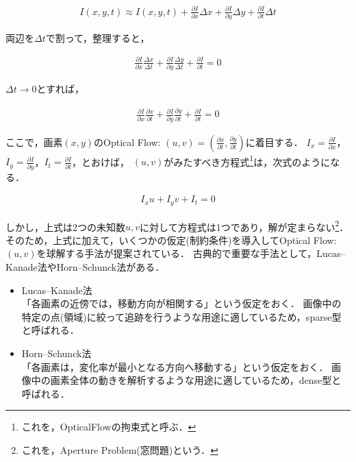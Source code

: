 \documentclass[11pt,a4j]{jarticle}
\begin{document}
      \begin{align}
        I(x,y,t) \approx I(x,y,t) + \frac{\partial I}{\partial x} \Delta x + \frac{\partial I}{\partial y} \Delta y + \frac{\partial I}{\partial t} \Delta t
      \end{align}

      両辺を$\Delta t$で割って，整理すると，

      \begin{align}
        \frac{\partial I}{\partial x} \frac{\Delta x}{\Delta t} + \frac{\partial I}{\partial y} \frac{\Delta y}{\Delta t} + \frac{\partial I}{\partial t} = 0
      \end{align}

      $\Delta t \to 0$とすれば，

      \begin{align}
        \frac{\partial I}{\partial x} \frac{\partial x}{\partial t} + \frac{\partial I}{\partial y} \frac{\partial y}{\partial t} + \frac{\partial I}{\partial t} = 0
      \end{align}

      ここで，画素$(x,y)$のOptical Flow: $(u,v) = \left(\frac{\partial x}{\partial t}, \frac{\partial y}{\partial t} \right)$に着目する．
      $I_x = \frac{\partial I}{\partial x}$，$I_y = \frac{\partial I}{\partial y}$，$I_t = \frac{\partial I}{\partial t}$，とおけば，
      $(u,v)$がみたすべき方程式\footnote{これを，OpticalFlowの拘束式と呼ぶ．}は，次式のようになる．

      \begin{align}
        I_x u + I_y v + I_t = 0
      \end{align}

      しかし，上式は2つの未知数$u,v$に対して方程式は1つであり，解が定まらない\footnote{これを，Aperture Problem(窓問題)という．}．\cite{Szeliski:2010:CVA:1941882}
      そのため，上式に加えて，いくつかの仮定(制約条件)を導入してOptical Flow: $(u,v)$を球解する手法が提案されている．
      古典的で重要な手法として，Lucas–Kanade法やHorn–Schunck法がある．\cite{Horn:1980:DOF:888857}\cite{Lucas:1981:IIR:1623264.1623280}\cite{Harris88acombined}\cite{Tomasi91detectionand}

      \begin{itemize}
        \item Lucas–Kanade法 \\
          「各画素の近傍では，移動方向が相関する」という仮定をおく．
          画像中の特定の点(領域)に絞って追跡を行うような用途に適しているため，sparse型と呼ばれる．
        \item Horn–Schunck法 \\
          「各画素は，変化率が最小となる方向へ移動する」という仮定をおく．
          画像中の画素全体の動きを解析するような用途に適しているため，dense型と呼ばれる．
      \end{itemize}      
\end{document}
